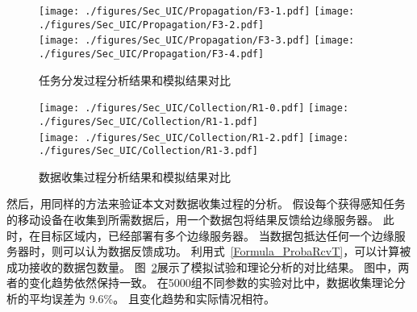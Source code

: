 


\begin{figure}[!h]
  \centering
  {\texttt{[image: ./figures/Sec\_UIC/Propagation/F3-1.pdf]}}
  {\texttt{[image: ./figures/Sec\_UIC/Propagation/F3-2.pdf]}}\\
  {\texttt{[image: ./figures/Sec\_UIC/Propagation/F3-3.pdf]}}
  {\texttt{[image: ./figures/Sec\_UIC/Propagation/F3-4.pdf]}}
  \vspace{-0.5em}
  \caption{任务分发过程分析结果和模拟结果对比}
  \vspace{-0.5em}
  \label{Figure_PropagationTest}
\end{figure}

\begin{figure}[!h]
  \centering
  {\texttt{[image: ./figures/Sec\_UIC/Collection/R1-0.pdf]}}
  {\texttt{[image: ./figures/Sec\_UIC/Collection/R1-1.pdf]}}\\
  {\texttt{[image: ./figures/Sec\_UIC/Collection/R1-2.pdf]}}
  {\texttt{[image: ./figures/Sec\_UIC/Collection/R1-3.pdf]}}
  \vspace{-0.5em}
  \caption{数据收集过程分析结果和模拟结果对比}
  \vspace{-2em}
  \label{Figure_CollectionTest}
  \end{figure}

然后，用同样的方法来验证本文对数据收集过程的分析。
假设每个获得感知任务的移动设备在收集到所需数据后，用一个数据包将结果反馈给边缘服务器。
此时，在目标区域内，已经部署有多个边缘服务器。
当数据包抵达任何一个边缘服务器时，则可以认为数据反馈成功。
利用式~\eqref{Formula_ProbaRcvT}，可以计算被成功接收的数据包数量。
图~\ref{Figure_CollectionTest}展示了模拟试验和理论分析的对比结果。
图中，两者的变化趋势依然保持一致。
在5000组不同参数的实验对比中，数据收集理论分析的平均误差为 9.6\%。
且变化趋势和实际情况相符。

